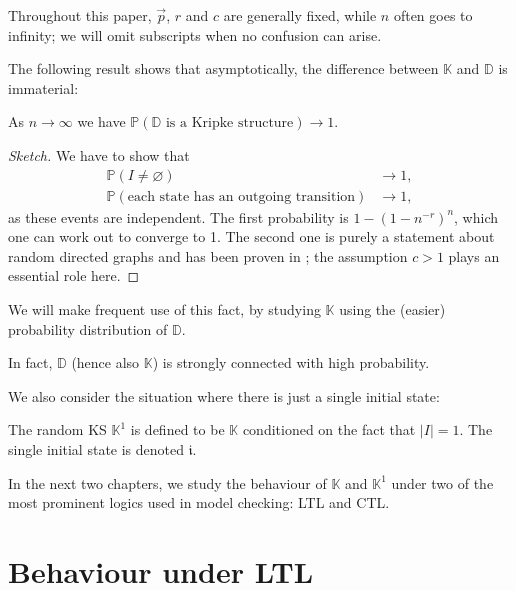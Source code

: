 \documentclass[runngingheads]{llncs}
\newcommand{\ini}{\mathfrak{i}}
\begin{document}
Throughout this paper, $\vec{p}$, $r$ and $c$ are generally fixed, while $n$ often goes to infinity; we will omit subscripts when no confusion can arise.

The following result shows that asymptotically, the difference between $\mathbb{K}$ and $\mathbb{D}$ is immaterial:

\begin{theorem} \label{thm:KS}
As $n \rightarrow \infty$ we have $\mathbb{P}(\mathbb{D} \textrm{ is a Kripke structure}) \rightarrow 1$. 
\end{theorem}

\begin{proof}[Sketch]
We have to show that 
\begin{align*}
\mathbb{P}(I \neq \varnothing) &\rightarrow 1,\\
\mathbb{P}(\textrm{each state has an outgoing transition}) &\rightarrow 1,
\end{align*}
as these events are independent. The first probability is $1-(1-n^{-r})^n$, which one can work out to converge to 1. The second one is purely a statement about random directed graphs and has been proven in \cite{graham2008note}; the assumption $c > 1$ plays an essential role here.
\end{proof}

We will make frequent use of this fact, by studying $\mathbb{K}$ using the (easier) probability distribution of $\mathbb{D}$. 

\begin{remark}
In fact, $\mathbb{D}$ (hence also $\mathbb{K}$) is strongly connected with high probability.
\end{remark}

We also consider the situation where there is just a single initial state:

\begin{definition} \label{def:K1}
The random KS $\mathbb{K}^1$ is defined to be $\mathbb{K}$ conditioned on the fact that $|I| = 1$. The single initial state is denoted $\ini$.
\end{definition}

In the next two chapters, we study the behaviour of $\mathbb{K}$ and $\mathbb{K}^1$ under two of the most prominent logics used in model checking: LTL and CTL.

\section{Behaviour under LTL} \label{sec:ltl}
\end{document}
